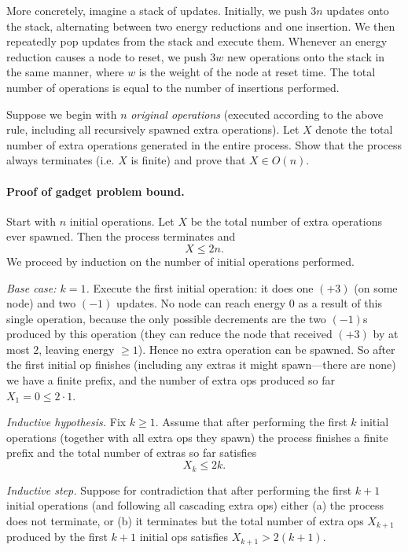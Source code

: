 \documentclass[11pt]{article}
\begin{document}
More concretely, imagine a stack of updates. Initially, we push $3n$ updates onto the stack, alternating between two energy reductions and one insertion. We then repeatedly pop updates from the stack and execute them. Whenever an energy reduction causes a node to reset, we push $3w$ new operations onto the stack in the same manner, where $w$ is the weight of the node at reset time. The total number of operations is equal to the number of insertions performed.

Suppose we begin with $n$ \emph{original operations} (executed according to the above rule, including all recursively spawned extra operations). Let $X$ denote the total number of extra operations generated in the entire process. Show that the process always terminates (i.e. $X$ is finite) and prove that $X \in O(n)$.

\paragraph{Proof of gadget problem bound.}
Start with $n$ initial operations. Let $X$ be the total number of extra operations ever spawned. Then the process terminates and
\[
X \le 2n.
\]
We proceed by induction on the number of initial operations performed.

\emph{Base case: $k = 1$.}
Execute the first initial operation: it does one $(+3)$ (on some node) and two $(-1)$ updates. No node can reach energy $0$ as a result of this single operation, because the only possible decrements are the two $(-1)$s produced by this operation (they can reduce the node that received $(+3)$ by at most $2$, leaving energy $\ge 1$). Hence no extra operation can be spawned. So after the first initial op finishes (including any extras it might spawn---there are none) we have a finite prefix, and the number of extra ops produced so far $X_1 = 0 \le 2\cdot 1$.

\emph{Inductive hypothesis.}
Fix $k\ge 1$. Assume that after performing the first $k$ initial operations (together with all extra ops they spawn) the process finishes a finite prefix and the total number of extras so far satisfies
\[
X_k \le 2k.
\]

\emph{Inductive step.}
Suppose for contradiction that after performing the first $k+1$ initial operations (and following all cascading extra ops) either (a) the process does not terminate, or (b) it terminates but the total number of extra ops $X_{k+1}$ produced by the first $k+1$ initial ops satisfies $X_{k+1}>2(k+1)$.
\end{document}
